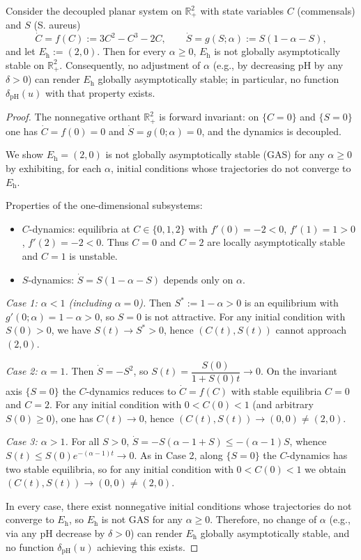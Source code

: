 ﻿\begin{proposition}\label{prop:eh-not-globally-stable}
Consider the decoupled planar system on $\mathbb{R}_+^2$ with state variables $C$ (commensals) and $S$ (S. aureus)
\[
\dot C = f(C) := 3C^2 - C^3 - 2C, \qquad
\dot S = g(S;\alpha) := S(1-\alpha- S),
\]
and let $E_{\mathrm h}:=(2,0)$. Then for every $\alpha\ge 0$, $E_{\mathrm h}$ is not globally asymptotically stable on $\mathbb{R}_+^2$. Consequently, no adjustment of $\alpha$ (e.g., by decreasing pH by any $\delta>0$) can render $E_{\mathrm h}$ globally asymptotically stable; in particular, no function $\delta_{\mathrm{pH}}(u)$ with that property exists.
\end{proposition}

\begin{proof}
The nonnegative orthant $\mathbb{R}_+^2$ is forward invariant: on $\{C=0\}$ and $\{S=0\}$ one has $\dot C=f(0)=0$ and $\dot S=g(0;\alpha)=0$, and the dynamics is decoupled.

We show $E_{\mathrm h}=(2,0)$ is not globally asymptotically stable (GAS) for any $\alpha\ge 0$ by exhibiting, for each $\alpha$, initial conditions whose trajectories do not converge to $E_{\mathrm h}$.

Properties of the one-dimensional subsystems:
\begin{itemize}
  \item $C$-dynamics: equilibria at $C\in\{0,1,2\}$ with $f'(0)=-2<0$, $f'(1)=1>0$, $f'(2)=-2<0$. Thus $C=0$ and $C=2$ are locally asymptotically stable and $C=1$ is unstable.
  \item $S$-dynamics: $\dot S=S(1-\alpha-S)$ depends only on $\alpha$.
\end{itemize}

\emph{Case 1: $\alpha<1$ (including $\alpha=0$).} Then $S^*:=1-\alpha>0$ is an equilibrium with $g'(0;\alpha)=1-\alpha>0$, so $S=0$ is not attractive. For any initial condition with $S(0)>0$, we have $S(t)\to S^*>0$, hence $(C(t),S(t))$ cannot approach $(2,0)$.

\emph{Case 2: $\alpha=1$.} Then $\dot S=-S^2$, so $S(t)=\dfrac{S(0)}{1+S(0)t}\to 0$. On the invariant axis $\{S=0\}$ the $C$-dynamics reduces to $\dot C=f(C)$ with stable equilibria $C=0$ and $C=2$. For any initial condition with $0<C(0)<1$ (and arbitrary $S(0)\ge 0$), one has $C(t)\to 0$, hence $(C(t),S(t))\to (0,0)\ne (2,0)$.

\emph{Case 3: $\alpha>1$.} For all $S>0$, $\dot S=-S(\alpha-1+S)\le-(\alpha-1)S$, whence $S(t)\le S(0) e^{-(\alpha-1)t}\to 0$. As in Case 2, along $\{S=0\}$ the $C$-dynamics has two stable equilibria, so for any initial condition with $0<C(0)<1$ we obtain $(C(t),S(t))\to (0,0)\ne (2,0)$.

In every case, there exist nonnegative initial conditions whose trajectories do not converge to $E_{\mathrm h}$, so $E_{\mathrm h}$ is not GAS for any $\alpha\ge 0$. Therefore, no change of $\alpha$ (e.g., via any pH decrease by $\delta>0$) can render $E_{\mathrm h}$ globally asymptotically stable, and no function $\delta_{\mathrm{pH}}(u)$ achieving this exists.\qedhere
\end{proof}
